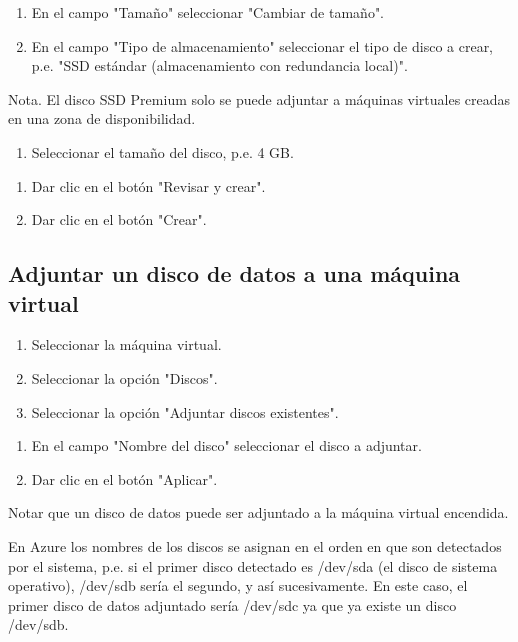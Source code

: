 \begin{enumerate}
\item En el campo "Tamaño" seleccionar "Cambiar de tamaño".
\item En el campo "Tipo de almacenamiento" seleccionar el tipo de disco a crear, p.e. "SSD estándar (almacenamiento con redundancia local)".
\end{enumerate}

Nota. El disco SSD Premium solo se puede adjuntar a máquinas virtuales creadas en una zona de disponibilidad.

\begin{enumerate}
\item Seleccionar el tamaño del disco, p.e. 4 GB.
\end{enumerate}

\begin{enumerate}
\item Dar clic en el botón "Revisar y crear".
\item Dar clic en el botón "Crear".
\end{enumerate}

\subsection{Adjuntar un disco de datos a una máquina virtual}

\begin{enumerate}
\item Seleccionar la máquina virtual.
\item Seleccionar la opción "Discos".
\item Seleccionar la opción "Adjuntar discos existentes".
\end{enumerate}

\begin{enumerate}
\item En el campo "Nombre del disco" seleccionar el disco a adjuntar.
\item Dar clic en el botón "Aplicar".
\end{enumerate}

Notar que un disco de datos puede ser adjuntado a la máquina virtual encendida.

En Azure los nombres de los discos se asignan en el orden en que son detectados por el sistema, p.e. si el primer disco detectado es /dev/sda (el disco de sistema operativo), /dev/sdb sería el segundo, y así sucesivamente. En este caso, el primer disco de datos adjuntado sería /dev/sdc ya que ya existe un disco /dev/sdb.


